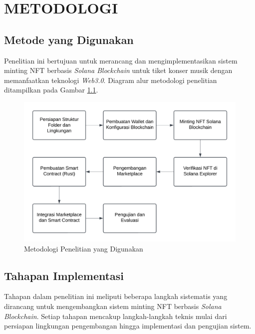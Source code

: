 \setlength{\parskip}{0pt} %
\setlength{\baselineskip}{1.2\baselineskip} %
\setlength{\parindent}{1em} %
\setlength{\intextsep}{0pt} %
\setlength{\abovecaptionskip}{1pt} %
\setlength{\belowcaptionskip}{1pt} %

\raggedbottom %



\chapter{METODOLOGI}

\section{Metode yang Digunakan}
Penelitian ini bertujuan untuk merancang dan mengimplementasikan sistem minting NFT berbasis \textit{Solana Blockchain} untuk tiket konser musik dengan memanfaatkan teknologi \textit{Web3.0}. Diagram alur metodologi penelitian ditampilkan pada Gambar \ref{fig:metodologi-penelitian}.

\begin{figure}[H]
    \centering
    \includegraphics    {gambar/Diagram3.1.png}
    \caption{Metodologi Penelitian yang Digunakan}
    \label{fig:metodologi-penelitian}
\end{figure}

\section{Tahapan Implementasi}
Tahapan dalam penelitian ini meliputi beberapa langkah sistematis yang dirancang untuk mengembangkan sistem minting NFT berbasis \textit{Solana Blockchain}. Setiap tahapan mencakup langkah-langkah teknis mulai dari persiapan lingkungan pengembangan hingga implementasi dan pengujian sistem.

